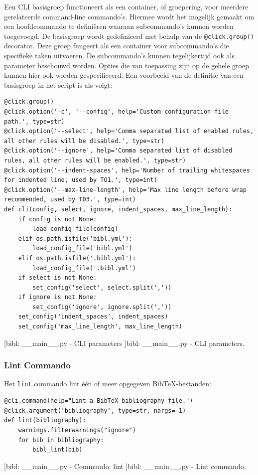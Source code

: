 Een \acrshort{CLI} basisgroep functioneert als een container, of groepering, voor meerdere gerelateerde command-line commando's. Hiermee wordt het mogelijk gemaakt om een hoofdcommando te definiëren waaraan subcommando's kunnen worden toegevoegd.
De basisgroep wordt gedefinieerd met behulp van de \texttt{@click.group()} decorator. Deze groep fungeert als een container voor subcommando's die specifieke taken uitvoeren. De subcommando's kunnen tegelijkertijd ook als parameter beschouwd worden. Opties die van toepassing zijn op de gehele groep kunnen hier ook worden gespecificeerd. Een voorbeeld van de definitie van een basisgroep in het script is als volgt:

\begin{verbatim}
@click.group()
@click.option('-c', '--config', help='Custom configuration file path.', type=str)
@click.option('--select', help='Comma separated list of enabled rules, all other rules will be disabled.', type=str)
@click.option('--ignore', help='Comma separated list of disabled rules, all other rules will be enabled.', type=str)
@click.option('--indent-spaces', help='Number of trailing whitespaces for indented line, used by TO1.', type=int)
@click.option('--max-line-length', help='Max line length before wrap recommended, used by T03.', type=int)
def cli(config, select, ignore, indent_spaces, max_line_length):
    if config is not None:
        load_config_file(config)
    elif os.path.isfile('bibl.yml'):
        load_config_file('bibl.yml')
    elif os.path.isfile('.bibl.yml'):
        load_config_file('.bibl.yml')
    if select is not None:
        set_config('select', select.split(','))
    if ignore is not None:
        set_config('ignore', ignore.split(','))
    set_config('indent_spaces', indent_spaces)
    set_config('max_line_length', max_line_length)
\end{verbatim}
[bibl: \_\_main\_\_.py - \acrshort{CLI} parameters ]{bibl: \_\_main\_\_.py - \acrshort{CLI} parameters. \label{lst:bibl_main_cli}}

\subsubsection{Lint Commando}

Het \texttt{lint} commando lint één of meer opgegeven BibTeX-bestanden:

\begin{verbatim}
@cli.command(help="Lint a BibTeX bibliography file.")
@click.argument('bibliography', type=str, nargs=-1)
def lint(bibliography):
    warnings.filterwarnings("ignore")
    for bib in bibliography:
        bibl_lint(bib)
\end{verbatim}
[bibl: \_\_main\_\_.py - Commando: lint ]{bibl: \_\_main\_\_.py - Lint commando. \label{lst:bibl_main_lint_command}}

